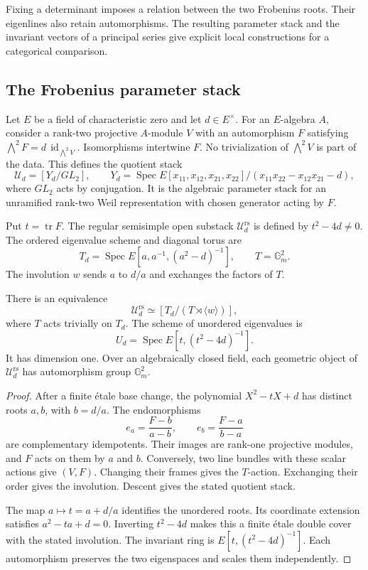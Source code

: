 Fixing a determinant imposes a relation between the two Frobenius
roots. Their eigenlines also retain automorphisms. The resulting
parameter stack and the invariant vectors of a principal series give
explicit local constructions for a categorical comparison.

\subsection{The Frobenius parameter stack}

Let $E$ be a field of characteristic zero and let $d\in E^\times$.
For an $E$-algebra $A$, consider a rank-two projective $A$-module $V$
with an automorphism $F$ satisfying
$\bigwedge^2F=d\,\operatorname{id}_{\bigwedge^2V}$.
Isomorphisms intertwine $F$. No trivialization of $\bigwedge^2V$ is
part of the data. This defines the quotient stack
\[
 \mathcal U_d=[Y_d/GL_2],\qquad
 Y_d=\operatorname{Spec}
 E[x_{11},x_{12},x_{21},x_{22}]/(x_{11}x_{22}-x_{12}x_{21}-d),
\]
where $GL_2$ acts by conjugation. It is the algebraic parameter stack
for an unramified rank-two Weil representation with chosen generator
acting by $F$.

Put $t=\operatorname{tr}F$. The regular semisimple open substack
$\mathcal U_d^{\mathrm{rs}}$ is defined by $t^2-4d\ne0$.
The ordered eigenvalue scheme and diagonal torus are
\[
 T_d=\operatorname{Spec}E[a,a^{-1},(a^2-d)^{-1}],\qquad
 T=\mathbb G_m^2.
\]
The involution $w$ sends $a$ to $d/a$ and exchanges the factors of $T$.

\begin{proposition}
\label{v4-arith:w5-e:local:frobenius-stack}
There is an equivalence
\[
 \mathcal U_d^{\mathrm{rs}}\simeq[T_d/(T\rtimes\langle w\rangle)],
\]
where $T$ acts trivially on $T_d$. The scheme of unordered eigenvalues is
\[
 U_d=\operatorname{Spec}E[t,(t^2-4d)^{-1}].
\]
It has dimension one. Over an algebraically closed field, each
geometric object of $\mathcal U_d^{\mathrm{rs}}$ has automorphism group
$\mathbb G_m^2$.
\end{proposition}

\begin{proof}
After a finite \textrm{\'etale} base change, the polynomial
$X^2-tX+d$ has distinct roots $a,b$, with $b=d/a$.
The endomorphisms
\[
 e_a=\frac{F-b}{a-b},\qquad e_b=\frac{F-a}{b-a}
\]
are complementary idempotents. Their images are rank-one projective
modules, and $F$ acts on them by $a$ and $b$.
Conversely, two line bundles with these scalar actions give $(V,F)$.
Changing their frames gives the $T$-action. Exchanging their order
gives the involution. Descent gives the stated quotient stack.

The map $a\mapsto t=a+d/a$ identifies the unordered roots.
Its coordinate extension satisfies $a^2-ta+d=0$.
Inverting $t^2-4d$ makes this a finite \textrm{\'etale} double cover
with the stated involution. The invariant ring is
$E[t,(t^2-4d)^{-1}]$. Each automorphism preserves the two eigenspaces
and scales them independently.
\end{proof}

